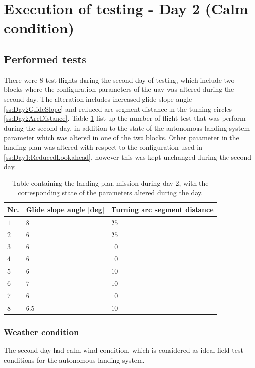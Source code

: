\section{Execution of testing - Day 2 (Calm condition)}
\subsection{Performed tests}
There were 8 test flights during the second day of testing, which include two blocks where the configuration parameters of the \gls{uav} was altered during the second day. The alteration includes increased glide slope angle \ref{ss:Day2GlideSlope} and reduced arc segment distance in the turning circles \ref{ss:Day2ArcDistance}. Table \ref{tb:Day2ParameterAlteration} list up the number of flight test that was perform during the second day, in addition to the state of the autonomous landing system parameter which was altered in one of the two blocks. Other parameter in the landing plan was altered with respect to the configuration used in \ref{ss:Day1:ReducedLookahead}, however this was kept unchanged during the second day.
\begin{table}[H]
\begin{tabular}{| p{0.5cm} | p{3cm} | p{4cm} |}
\hline
\textbf{Nr.} & \textbf{Glide slope angle [deg]} &  \textbf{Turning arc segment distance}\\ \hline
$1$				& $8$ & $ 25 $		\\ \hline
$2$				& $6$ & $ 25 $		\\ \hline
$3$				& $6$ & $ 10 $		\\ \hline
$4$				& $6$ & $ 10 $		\\ \hline
$5$				& $6$ & $ 10 $			\\ \hline
$6$				& $7$ & $ 10 $		\\ \hline
$7$				& $6$ & $ 10 $			\\ \hline
$8$				& $6.5$ & $ 10 $	\\ \hline
\end{tabular}
\caption{Table containing the landing plan mission during day 2, with the corresponding state of the parameters altered during the day.}
\label{tb:Day2ParameterAlteration}
\end{table}
\subsubsection{Weather condition}
The second day had calm wind condition, which is considered as ideal field test conditions for the autonomous landing system.
